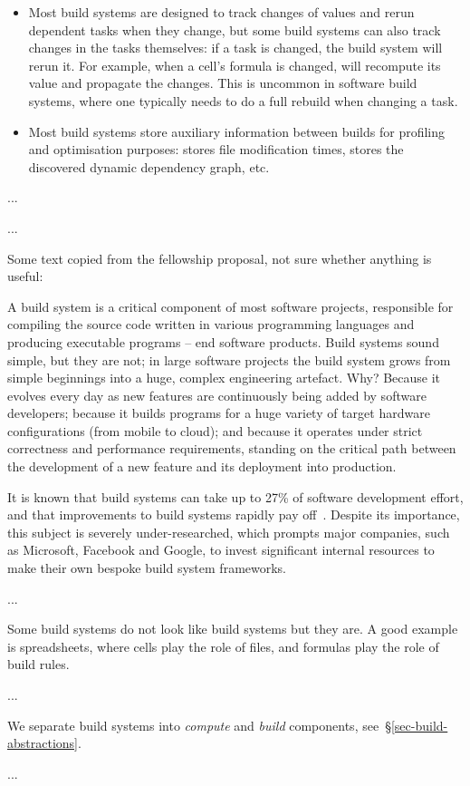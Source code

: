 \begin{itemize}
    \item Most build systems are designed to track changes of values and rerun
    dependent tasks when they change, but some build systems can also track
    changes in the tasks themselves: if a task is changed, the build system
    will rerun it. For example, when a cell's formula is changed, \Excel will
    recompute its value and propagate the changes. This is uncommon in software
    build systems, where one typically needs to do a full rebuild when changing
    a task.

    \item Most build systems store auxiliary information between builds for
    profiling and optimisation purposes: \Make stores file modification times,
    \Shake stores the discovered dynamic dependency graph, etc.

\end{itemize}


...


...

Some text copied from the fellowship proposal, not sure whether anything is useful:

A build system is a critical component of most software projects, responsible
for compiling the source code written in various programming languages and
producing executable programs -- end software products. Build systems sound
simple, but they are not; in large software projects the build system grows from
simple beginnings into a huge, complex engineering artefact. Why? Because it
evolves every day as new features are continuously being added by software
developers; because it builds programs for a huge variety of target hardware
configurations (from mobile to cloud); and because it operates under strict
correctness and performance requirements, standing on the critical path between
the development of a new feature and its deployment into production.

It is known that build systems can take up to 27\% of software development
effort, and that improvements to build systems rapidly pay off~\cite{build_maintenance}.
Despite its importance, this subject is severely under-researched, which prompts
major companies, such as Microsoft, Facebook and Google, to invest significant
internal resources to make their own bespoke build system frameworks.

...

Some build systems do not look like build systems but they are. A good example
is spreadsheets, where cells play the role of files, and formulas play the role
of build rules.

...

We separate build systems into \emph{compute} and \emph{build} components,
see~\S\ref{sec-build-abstractions}.

...